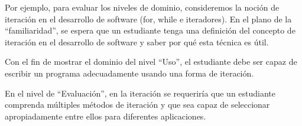 Por ejemplo, para evaluar los niveles de dominio, consideremos la noción de iteración en el desarrollo de software (for, while e iteradores). 
En el plano de la ``familiaridad'', se espera que un estudiante tenga una definición del 
concepto de iteración en el desarrollo de software y saber por qué esta técnica es útil. 

Con el fin de mostrar el dominio del nivel ``Uso'', el estudiante debe ser capaz de 
escribir un programa adecuadamente usando una forma de iteración. 

En el nivel de ``Evaluación'', en la iteración se requerirí­a que un estudiante comprenda múltiples métodos de iteración y 
que sea capaz de seleccionar apropiadamente entre ellos para diferentes aplicaciones.

